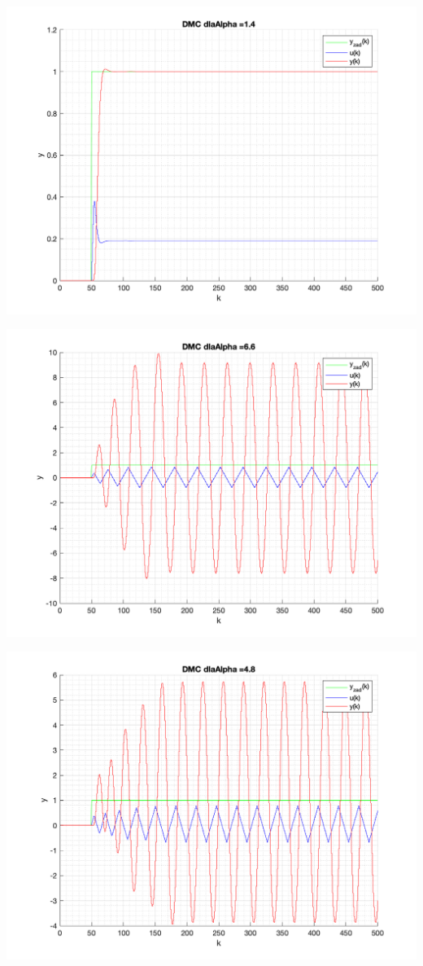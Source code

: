 \documentclass[a4paper, 11pt]{article}
\begin{document}
\begin{enumerate}
 \includegraphics[width=\linewidth]{./ModelsDodatkowe_Alpha/P4_DMC_Alpha_1_4_png.png} 
 
 \includegraphics[width=\linewidth]{./ModelsDodatkowe_Alpha/P4_DMC_Alpha_6_6_png.png} 
 
 \includegraphics[width=\linewidth]{./ModelsDodatkowe_Alpha/P4_DMC_Alpha_4_8_png.png} 
 

\end{enumerate}
\end{document}
